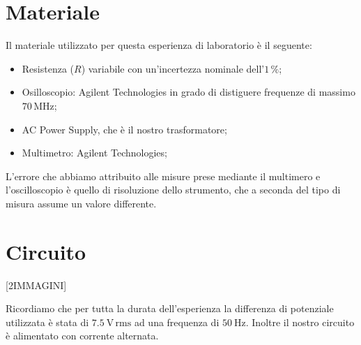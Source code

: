 \section*{Materiale}

Il materiale utilizzato per questa esperienza di laboratorio è il seguente:

\begin{itemize}
    \setlength{\itemsep}{1pt}
	\item{Resistenza ($R$) variabile con un'incertezza nominale dell'$1\,\%$;}
	\item{Osilloscopio: Agilent Technologies in grado di distiguere frequenze di massimo $70\,\si{\mega\hertz}$;}
	\item{AC Power Supply, che è il nostro trasformatore;}
	\item{Multimetro: Agilent Technologies;}
\end{itemize}

L'errore che abbiamo attribuito alle misure prese mediante il multimero e l'oscilloscopio è quello di risoluzione dello strumento, che a seconda del tipo di misura assume un valore differente.

\section*{Circuito}

[2IMMAGINI]

Ricordiamo che per tutta la durata dell'esperienza la differenza di potenziale utilizzata è stata di $\SI{7.5}{\volt}\,\text{rms}$ ad una frequenza di $\SI{50}{\hertz}$. Inoltre il nostro circuito è alimentato con corrente alternata.
